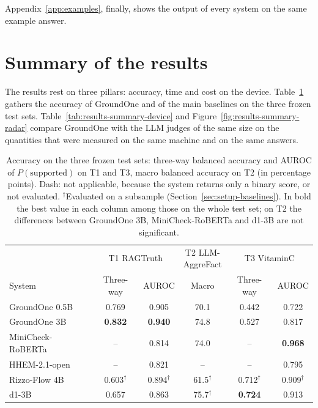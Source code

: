 Appendix~\ref{app:examples}, finally, shows the output of every system on the same example answer.

\section{Summary of the results}
\label{sec:results-summary}

The results rest on three pillars: accuracy, time and cost on the device. Table~\ref{tab:results-summary-accuracy}
gathers the accuracy of GroundOne and of the main baselines on the three frozen test sets. Table~\ref{tab:results-summary-device}
and Figure~\ref{fig:results-summary-radar} compare GroundOne with the LLM judges of the same size on the quantities
that were measured on the same machine and on the same answers.

\begin{table}[htbp]
\centering
\caption{Accuracy on the three frozen test sets: three-way balanced accuracy and AUROC of $P(\text{supported})$ on T1
and T3, macro balanced accuracy on T2 (in percentage points). Dash: not applicable, because the system returns only a
binary score, or not evaluated. $^{\dagger}$Evaluated on a subsample (Section~\ref{sec:setup-baselines}). In bold the best value in each column among those on the whole test set; on T2 the differences between GroundOne 3B, MiniCheck-RoBERTa and d1-3B are not significant.}
\label{tab:results-summary-accuracy}
\small
\setlength{\tabcolsep}{4pt}
\begin{tabular}{lccccc}
\toprule
 & \multicolumn{2}{c}{T1 RAGTruth} & \makecell{T2 LLM-\\AggreFact} & \multicolumn{2}{c}{T3 VitaminC} \\
\cmidrule(lr){2-3}\cmidrule(lr){4-4}\cmidrule(l){5-6}
System & Three-way & AUROC & Macro & Three-way & AUROC \\
\midrule
GroundOne 0.5B & 0.769 & 0.905 & 70.1 & 0.442 & 0.722 \\
GroundOne 3B & \textbf{0.832} & \textbf{0.940} & 74.8 & 0.527 & 0.817 \\
MiniCheck-RoBERTa & -- & 0.814 & 74.0 & -- & \textbf{0.968} \\
HHEM-2.1-open & -- & 0.821 & -- & -- & 0.795 \\
Rizzo-Flow 4B & 0.603$^{\dagger}$ & 0.894$^{\dagger}$ & 61.5$^{\dagger}$ & 0.712$^{\dagger}$ & 0.909$^{\dagger}$ \\
d1-3B & 0.657 & 0.863 & 75.7$^{\dagger}$ & \textbf{0.724} & 0.913 \\
\bottomrule
\end{tabular}
\end{table}

